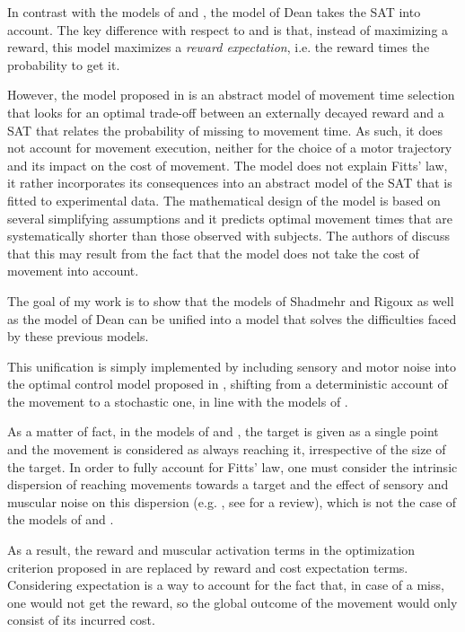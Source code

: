 \documentclass[pdftex,a4paper,12pt]{report}
\begin{document}
In contrast with the models of \cite{shadmehr10} and \cite{rigoux12_plos}, the model of Dean \cite{Dean2007} takes the SAT into account. The key difference with respect to \cite{shadmehr10} and \cite{rigoux12_plos} is that, instead of maximizing a reward, this model maximizes a {\em reward expectation}, i.e. the reward times the probability to get it.

However, the model proposed in \cite{Dean2007} is an abstract model of movement time selection that looks for an optimal trade-off between an externally decayed reward and a SAT that relates the probability of missing to movement time. As such, it does not account for movement execution, neither for the choice of a motor trajectory and its impact on the cost of movement.
The model does not explain Fitts' law, it rather incorporates its consequences into an abstract model of the SAT that is fitted to experimental data.
The mathematical design of the model is based on several simplifying assumptions and it predicts optimal movement times that are systematically shorter than those observed with subjects. The authors of \cite{Dean2007} discuss that this may result from the fact that the model does not take the cost of movement into account.

The goal of my work is to show that the models of Shadmehr \cite{shadmehr10} and Rigoux \cite{rigoux12_plos} as well as the model of Dean \cite{Dean2007} can be unified into a model that solves the difficulties faced by these previous models. 

This unification is simply implemented by including sensory and motor noise into the optimal control model proposed in \cite{rigoux12_plos}, shifting from a deterministic account of the movement to a stochastic one, in line with the models of \cite{harris98_N,todorov02_NN,todorov04_NN,todorov05_NC,li2006}.

As a matter of fact, in the models of \cite{shadmehr10} and \cite{rigoux12_plos}, the target is given as a single point and the movement is considered as always reaching it, irrespective of the size of the target. In order to fully account for Fitts' law, one must consider the intrinsic dispersion of reaching movements towards a target and the effect of sensory and muscular noise on this dispersion (e.g. \cite{harris98_N}, see \cite{faisal08} for a review), which is not the case of the models of \cite{shadmehr10} and \cite{rigoux12_plos}. 

As a result, the reward and muscular activation terms in the optimization criterion proposed in \cite{rigoux12_plos} are replaced by reward and cost expectation terms. Considering expectation is a way to account for the fact that, in case of a miss, one would not get the reward, so the global outcome of the movement would only consist of its incurred cost. 
\end{document}
